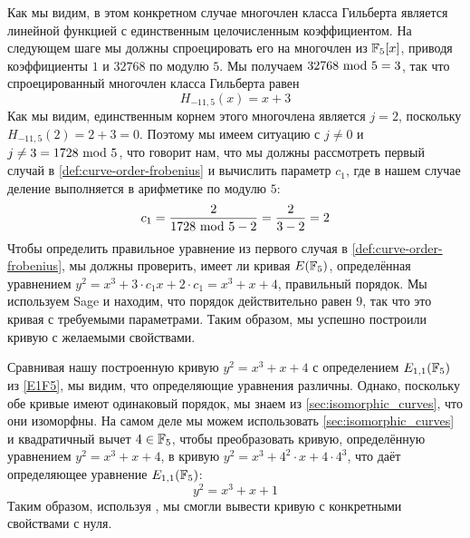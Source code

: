 \begin{example}
Как мы видим, в этом конкретном случае многочлен класса Гильберта является линейной функцией с единственным целочисленным коэффициентом. На следующем шаге мы должны спроецировать его на многочлен из $\mathbb{F}_5[x]$, приводя коэффициенты $1$ и $32768$ по модулю $5$. Мы получаем $32768 \text{ mod } 5=3$, так что спроецированный многочлен класса Гильберта равен
$$
H_{-11,5}(x)=x+3
$$ 
Как мы видим, единственным корнем этого многочлена является $j=2$, поскольку $H_{-11,5}(2)=2+3=0$. Поэтому мы имеем ситуацию с $j\neq 0$ и $j\neq 3 = 1728 \text{ mod } 5$, что говорит нам, что мы должны рассмотреть первый случай в \ref{def:curve-order-frobenius} и вычислить параметр $c_1$, где в нашем случае деление выполняется в арифметике по модулю $5$:
\begin{equation}
c_1 = \frac{2}{1728 \text{ mod } 5-2} = \frac{2}{3-2}= 2
\end{equation}
Чтобы определить правильное уравнение из первого случая в \ref{def:curve-order-frobenius}, мы должны проверить, имеет ли кривая $E(\mathbb{F}_5)$, определённая уравнением  $y^2 =  x^3 + 3\cdot c_1 x + 2\cdot c_1 = x^3 + x + 4$, правильный порядок. Мы используем Sage и находим, что порядок действительно равен $9$, так что это кривая с требуемыми параметрами. Таким образом, мы успешно построили кривую с желаемыми свойствами.

Сравнивая нашу построенную кривую $y^2 =  x^3 + x + 4$ с определением $E_{1,1}(\mathbb{F}_5)$ из \examplename{} \ref{E1F5}, мы видим, что определяющие уравнения различны. Однако, поскольку обе кривые имеют одинаковый порядок, мы знаем из \ref{sec:isomorphic_curves}, что они изоморфны. На самом деле мы можем использовать \ref{sec:isomorphic_curves} и квадратичный вычет $4\in \mathbb{F}_5$, чтобы преобразовать кривую, определённую уравнением $y^2 = x^3 +x+4$, в кривую $y^2 = x^3 + 4^2\cdot x + 4\cdot 4^3$, что даёт определяющее уравнение $E_{1,1}(\mathbb{F}_5)$:
$$
y^2 = x^3 + x +1
$$
Таким образом, используя , мы смогли вывести кривую с конкретными свойствами с нуля.
\end{example}

